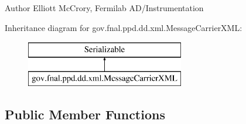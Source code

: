 \begin{DoxyAuthor}{Author}
Elliott Mc\-Crory, Fermilab A\-D/\-Instrumentation 
\end{DoxyAuthor}
Inheritance diagram for gov.\-fnal.\-ppd.\-dd.\-xml.\-Message\-Carrier\-X\-M\-L\-:\begin{figure}[H]
\begin{center}
\leavevmode
\includegraphics[height=2.000000cm]{classgov_1_1fnal_1_1ppd_1_1dd_1_1xml_1_1MessageCarrierXML}
\end{center}
\end{figure}
\subsection*{Public Member Functions}
